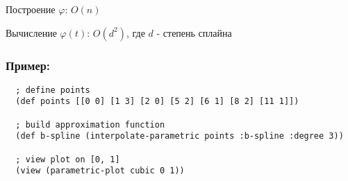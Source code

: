Построение $\varphi$: $O(n)$

Вычисление $\varphi(t)$: $O(d^2)$, где $d$ - степень сплайна


\subsubsection{Пример:}

\begin{verbatim}
  ; define points
  (def points [[0 0] [1 3] [2 0] [5 2] [6 1] [8 2] [11 1]])

  ; build approximation function
  (def b-spline (interpolate-parametric points :b-spline :degree 3))

  ; view plot on [0, 1]
  (view (parametric-plot cubic 0 1))
\end{verbatim}


